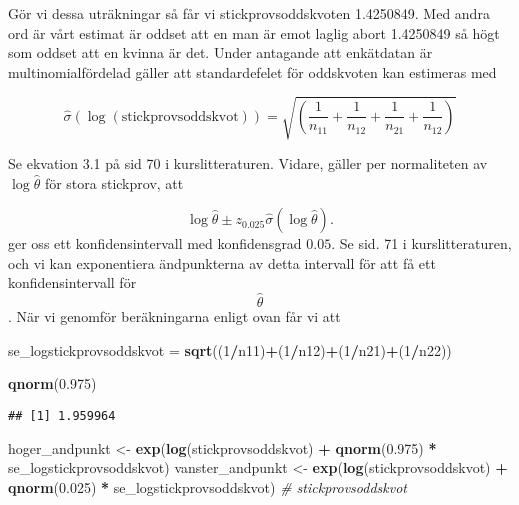 \documentclass[]{article}
\newenvironment{Shaded}{\begin{snugshade}}{\end{snugshade}}
\newcommand{\CommentTok}[1]{\textcolor[rgb]{0.56,0.35,0.01}{\textit{#1}}}
\newcommand{\DecValTok}[1]{\textcolor[rgb]{0.00,0.00,0.81}{#1}}
\newcommand{\FloatTok}[1]{\textcolor[rgb]{0.00,0.00,0.81}{#1}}
\newcommand{\KeywordTok}[1]{\textcolor[rgb]{0.13,0.29,0.53}{\textbf{#1}}}
\newcommand{\NormalTok}[1]{#1}
\newcommand{\OperatorTok}[1]{\textcolor[rgb]{0.81,0.36,0.00}{\textbf{#1}}}
\newcommand{\StringTok}[1]{\textcolor[rgb]{0.31,0.60,0.02}{#1}}
\begin{document}
Gör vi dessa uträkningar så får vi stickprovsoddskvoten 1.4250849. Med
andra ord är vårt estimat är oddset att en man är emot laglig abort
1.4250849 så högt som oddset att en kvinna är det. Under antagande att
enkätdatan är multinomialfördelad gäller att standardefelet för
oddskvoten kan estimeras med

\[ \widehat{\sigma}(\log (\text{stickprovsoddskvot})) = \sqrt{\left(\frac{1}{n_{11}} + \frac{1}{n_{12}} + \frac{1}{n_{21}} + \frac{1}{n_{12}}\right)}\]

Se ekvation 3.1 på sid 70 i kurslitteraturen. Vidare, gäller per
normaliteten av \(\log \widehat{\theta}\) för stora stickprov, att

\[ \log \widehat{\theta} \pm z_{0.025} \widehat{\sigma}(\log \widehat{\theta}).\]
ger oss ett konfidensintervall med konfidensgrad \(0.05\). Se sid. 71 i
kurslitteraturen, och vi kan exponentiera ändpunkterna av detta
intervall för att få ett konfidensintervall för \[\widehat{\theta}\].
När vi genomför beräkningarna enligt ovan får vi att

\begin{Shaded}
\begin{Highlighting}[]
\NormalTok{se_logstickprovsoddskvot =}\StringTok{ }\KeywordTok{sqrt}\NormalTok{((}\DecValTok{1}\OperatorTok{/}\NormalTok{n11)}\OperatorTok{+}\NormalTok{(}\DecValTok{1}\OperatorTok{/}\NormalTok{n12)}\OperatorTok{+}\NormalTok{(}\DecValTok{1}\OperatorTok{/}\NormalTok{n21)}\OperatorTok{+}\NormalTok{(}\DecValTok{1}\OperatorTok{/}\NormalTok{n22)) }

\KeywordTok{qnorm}\NormalTok{(}\FloatTok{0.975}\NormalTok{)}
\end{Highlighting}
\end{Shaded}

\begin{verbatim}
## [1] 1.959964
\end{verbatim}

\begin{Shaded}
\begin{Highlighting}[]
\NormalTok{hoger_andpunkt <-}\StringTok{ }\KeywordTok{exp}\NormalTok{(}\KeywordTok{log}\NormalTok{(stickprovsoddskvot) }\OperatorTok{+}\StringTok{ }\KeywordTok{qnorm}\NormalTok{(}\FloatTok{0.975}\NormalTok{) }\OperatorTok{*}\StringTok{ }\NormalTok{se_logstickprovsoddskvot)}
\NormalTok{vanster_andpunkt <-}\StringTok{ }\KeywordTok{exp}\NormalTok{(}\KeywordTok{log}\NormalTok{(stickprovsoddskvot) }\OperatorTok{+}\StringTok{ }\KeywordTok{qnorm}\NormalTok{(}\FloatTok{0.025}\NormalTok{) }\OperatorTok{*}\StringTok{ }\NormalTok{se_logstickprovsoddskvot)}
\CommentTok{# stickprovsoddskvot}
\end{Highlighting}
\end{Shaded}
\end{document}
